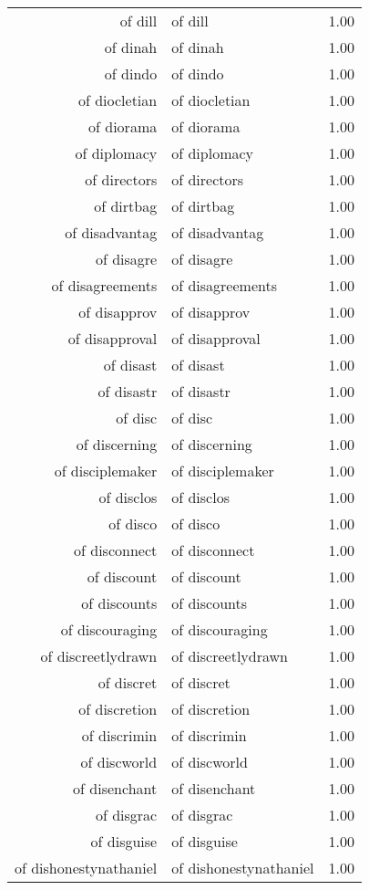 \begin{table}[ht]
\begin{tabular}{rlr}
  of dill & of dill & 1.00 \\ 
  of dinah & of dinah & 1.00 \\ 
  of dindo & of dindo & 1.00 \\ 
  of diocletian & of diocletian & 1.00 \\ 
  of diorama & of diorama & 1.00 \\ 
  of diplomacy & of diplomacy & 1.00 \\ 
  of directors & of directors & 1.00 \\ 
  of dirtbag & of dirtbag & 1.00 \\ 
  of disadvantag & of disadvantag & 1.00 \\ 
  of disagre & of disagre & 1.00 \\ 
  of disagreements & of disagreements & 1.00 \\ 
  of disapprov & of disapprov & 1.00 \\ 
  of disapproval & of disapproval & 1.00 \\ 
  of disast & of disast & 1.00 \\ 
  of disastr & of disastr & 1.00 \\ 
  of disc & of disc & 1.00 \\ 
  of discerning & of discerning & 1.00 \\ 
  of disciplemaker & of disciplemaker & 1.00 \\ 
  of disclos & of disclos & 1.00 \\ 
  of disco & of disco & 1.00 \\ 
  of disconnect & of disconnect & 1.00 \\ 
  of discount & of discount & 1.00 \\ 
  of discounts & of discounts & 1.00 \\ 
  of discouraging & of discouraging & 1.00 \\ 
  of discreetlydrawn & of discreetlydrawn & 1.00 \\ 
  of discret & of discret & 1.00 \\ 
  of discretion & of discretion & 1.00 \\ 
  of discrimin & of discrimin & 1.00 \\ 
  of discworld & of discworld & 1.00 \\ 
  of disenchant & of disenchant & 1.00 \\ 
  of disgrac & of disgrac & 1.00 \\ 
  of disguise & of disguise & 1.00 \\ 
  of dishonestynathaniel & of dishonestynathaniel & 1.00 \\ 

\end{tabular}
\end{table}
